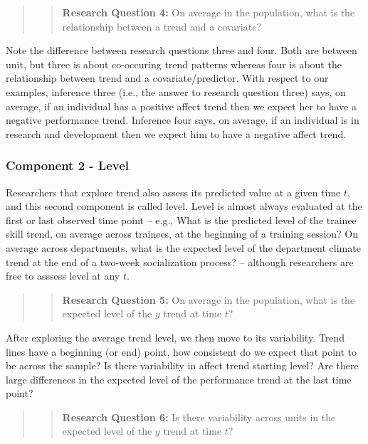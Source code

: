 \documentclass[english,,man]{apa6}
\begin{document}
\begin{quote}
\begin{quote}
\textbf{Research Question 4:} On average in the population, what is the relationship between a trend and a covariate?
\end{quote}
\end{quote}

Note the difference between research questions three and four. Both are between unit, but three is about co-occuring trend patterns whereas four is about the relationship between trend and a covariate/predictor. With respect to our examples, inference three (i.e., the answer to research question three) says, on average, if an individual has a positive affect trend then we expect her to have a negative performance trend. Inference four says, on average, if an individual is in research and development then we expect him to have a negative affect trend.

\hypertarget{component-2---level}{%
\subsubsection{Component 2 - Level}\label{component-2---level}}

Researchers that explore trend also assess its predicted value at a given time \(t\), and this second component is called level. Level is almost always evaluated at the first or last observed time point -- e.g., What is the predicted level of the trainee skill trend, on average across trainees, at the beginning of a training session? On average across departments, what is the expected level of the department climate trend at the end of a two-week socialization process? -- although researchers are free to asssess level at any \(t\).

\begin{quote}
\begin{quote}
\textbf{Research Question 5:} On average in the population, what is the expected level of the \(y\) trend at time \(t\)?
\end{quote}
\end{quote}

After exploring the average trend level, we then move to its variability. Trend lines have a beginning (or end) point, how consistent do we expect that point to be across the sample? Is there variability in affect trend starting level? Are there large differences in the expected level of the performance trend at the last time point?

\begin{quote}
\begin{quote}
\textbf{Research Question 6:} Is there variability across units in the expected level of the \(y\) trend at time \(t\)?
\end{quote}
\end{quote}
\end{document}
